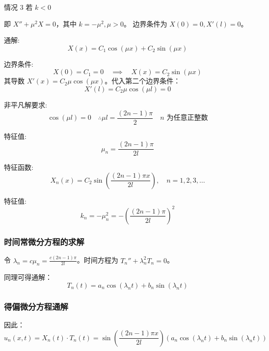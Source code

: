 \documentclass[a4paper, 12pt, oneside]{article} %
\numberwithin{subsection}{section}
\numberwithin{subsubsection}{subsection}
\theoremstyle{plain}
\theoremstyle{definition}
\theoremstyle{remark}
\begin{document}
		情况 3 \quad 若 \(k < 0\)
		
		即 \(X'' + \mu^2 X = 0\)，其中 \(k = -\mu^2, \mu > 0\)。
		边界条件为 $X(0) = 0, X'(l) = 0$。
		
		通解:
		\begin{equation}
			X(x) = C_1 \cos(\mu x) + C_2 \sin(\mu x)
		\end{equation}
		
		边界条件:
		\begin{equation}
			X(0) = C_1 = 0 \quad \implies \quad X(x) = C_2 \sin(\mu x)
		\end{equation}
		其导数 $X'(x) = C_2 \mu \cos(\mu x)$。代入第二个边界条件：
		\begin{equation}
			X'(l) = C_2 \mu \cos(\mu l) = 0
		\end{equation}
		
		非平凡解要求:
		\begin{equation*}
			\cos(\mu l) = 0 \quad \therefore \mu l = \frac{(2n-1)\pi}{2} \quad n \text{ 为任意正整数}
		\end{equation*}
		
		特征值:
		\begin{equation}
			\mu_n = \frac{(2n-1)\pi}{2l}
		\end{equation}
		
		特征函数:
		\begin{equation}
			X_n(x) = C_2 \sin\left(\frac{(2n-1)\pi x}{2l}\right), \quad n = 1, 2, 3, \ldots
		\end{equation}
		
		特征值:
		\begin{equation}
			k_n = -\mu_n^2 = -\left(\frac{(2n-1)\pi}{2l}\right)^2
		\end{equation}
		
		\subsubsection{时间常微分方程的求解}
		令 $\lambda_n = c \mu_n = \frac{c(2n-1)\pi}{2l}$。时间方程为 $T_n'' + \lambda_n^2 T_n = 0$。
		
		同理可得通解：
		\begin{equation}
			T_n(t) = a_n \cos(\lambda_n t) + b_n \sin(\lambda_n t)
		\end{equation}
		
		\subsubsection{得偏微分方程通解}
		因此：
		\begin{equation}
			u_n(x, t) = X_n(t) \cdot T_n(t) = \sin\left(\frac{(2n-1)\pi x}{2l}\right) \left( a_n \cos(\lambda_n t) + b_n \sin(\lambda_n t) \right)
		\end{equation}
		
\end{document}
